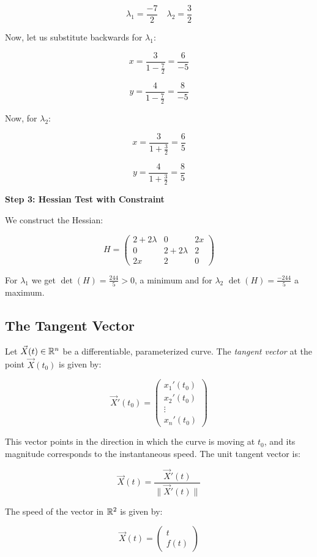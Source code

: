 \[
    \lambda_1 = \frac{-7}{2} \quad \lambda_2 = \frac{3}{2}
\]


Now, let us substitute backwards for \(\lambda_1\):

\[
    x = \frac{3}{1 - \frac{7}{2}} = \frac{6}{-5}
\]

\[
    y = \frac{4}{1 - \frac{7}{2}} = \frac{8}{-5}
\]

Now,  for \(\lambda_2\):

\[
    x = \frac{3}{1 + \frac{3}{2}} = \frac{6}{5}
\]

\[
    y = \frac{4}{1 + \frac{3}{2}} = \frac{8}{5}
\]


\textbf{Step 3: Hessian Test with Constraint}

We construct the Hessian:

\[
    H = \begin{pmatrix}
    2 + 2\lambda & 0 & 2x \\
    0 & 2 + 2\lambda & 2 \\
    2x & 2 & 0
    \end{pmatrix}
\]

For \(\lambda_1\) we get \( \det(H) =  \frac{244}{5} > 0 \), a minimum 
and for \(\lambda_2\) \(\det(H) = \frac{-244}{5}\) a maximum.

\subsection{The Tangent Vector}

Let \( \vec{X}(t) \in \mathbb{R}^n \) be a differentiable, parameterized curve. The \emph{tangent vector} at the point 
\( \vec{X}(t_0) \) is given by:

\[
    \vec{X}'(t_0) = \begin{pmatrix}
        x_1 ' (t_0) \\ x_2 ' (t_0) \\ \vdots \\ x_n ' (t_0)
    \end{pmatrix}
\]

This vector points in the direction in which the curve is moving at \( t_0 \), and its magnitude corresponds to the
 instantaneous speed. The unit tangent vector is:

\[
    \vec{X}(t) = \frac{\vec{X}'(t)}{\|\vec{X}'(t)\|}
\]

The speed of the vector in \(\mathbb{R}^2\) is given by:

\[
    \vec{X}(t) = \begin{pmatrix}
        t \\ f(t)
    \end{pmatrix}
\]

